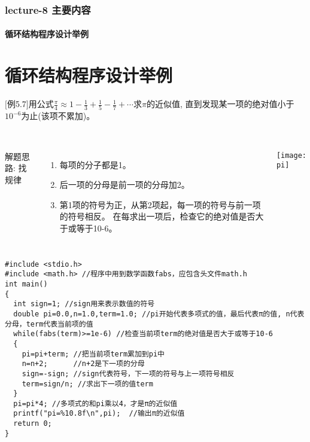 \begin{frame}[shrink]
  \frametitle{lecture-8 主要内容}
  \framesubtitle{循环结构程序设计举例}
  \tableofcontents[hideallsubsections]
\end{frame}

\section{循环结构程序设计举例}

\begin{frame}
$[$例5.7$]$用公式$\frac{\pi}{4}\approx 1-\frac{1}{3}+\frac{1}{5}-\frac{1}{7}+\cdots$求$\pi$的近似值, 直到发现某一项的绝对值小于$10^{-6}$为止(该项不累加)。\\
~\\
\begin{columns}
解题思路:  找规律
\begin{enumerate}
	\item 每项的分子都是1。
	\item 后一项的分母是前一项的分母加2。
	\item 第1项的符号为正，从第2项起，每一项的符号与前一项的符号相反。
	在每求出一项后，检查它的绝对值是否大于或等于10-6。
\end{enumerate}
\texttt{[image: pi]}
\end{columns}
\end{frame}

\begin{frame}
\begin{lstlisting}
#include <stdio.h>
#include <math.h> //程序中用到数学函数fabs，应包含头文件math.h
int main()
{
  int sign=1; //sign用来表示数值的符号
  double pi=0.0,n=1.0,term=1.0; //pi开始代表多项式的值，最后代表π的值, n代表分母，term代表当前项的值
  while(fabs(term)>=1e-6) //检查当前项term的绝对值是否大于或等于10-6
  {
    pi=pi+term; //把当前项term累加到pi中
    n=n+2;      //n+2是下一项的分母 
    sign=-sign; //sign代表符号，下一项的符号与上一项符号相反
    term=sign/n; //求出下一项的值term
  }
  pi=pi*4; //多项式的和pi乘以4，才是π的近似值
  printf("pi=%10.8f\n",pi);  //输出π的近似值  
  return 0;
}
\end{lstlisting}
\end{frame}

